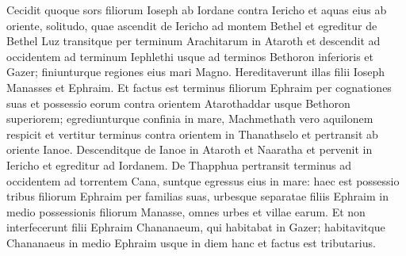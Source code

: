 \begin{biblechapter}  
\verse Cecidit quoque sors filiorum Ioseph ab Iordane contra Iericho et aquas eius ab oriente, solitudo, quae ascendit de Iericho ad montem Bethel 
\verse et egreditur de Bethel Luz transitque per terminum Arachitarum in Ataroth 
\verse et descendit ad occidentem ad terminum Iephlethi usque ad terminos Bethoron inferioris et Gazer; finiunturque regiones eius mari Magno. 
\verse Hereditaverunt illas filii Ioseph Manasses et Ephraim. 
\verse Et factus est terminus filiorum Ephraim per cognationes suas et possessio eorum contra orientem Atarothaddar usque Bethoron superiorem; 
\verse egrediunturque confinia in mare, Machmethath vero aquilonem respicit et vertitur terminus contra orientem in Thanathselo et pertransit ab oriente Ianoe. 
\verse Descenditque de Ianoe in Ataroth et Naaratha et pervenit in Iericho et egreditur ad Iordanem. 
\verse De Thapphua pertransit terminus ad occidentem ad torrentem Cana, suntque egressus eius in mare: haec est possessio tribus filiorum Ephraim per familias suas, 
\verse urbesque separatae filiis Ephraim in medio possessionis filiorum Manasse, omnes urbes et villae earum. 
\verse Et non interfecerunt filii Ephraim Chananaeum, qui habitabat in Gazer; habitavitque Chananaeus in medio Ephraim usque in diem hanc et factus est tributarius. 
\end{biblechapter}


